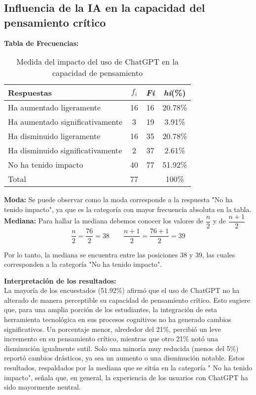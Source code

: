 \subsection{Influencia de la IA en la capacidad del pensamiento crítico}
\textbf{Tabla de Frecuencias:}
\begin{table}[H]
	\centering
	\renewcommand{\arraystretch}{1.2}
	\begin{tabular}{l c c c}
		\hline
		{Respuestas} & {\(f_i\)} & \textit{Fi} & \textit{hi}(\%)\\
		\hline
		Ha aumentado ligeramente       & 16 & 16 & 20.78\%\\
		Ha aumentado significativamente & 3  & 19 & 3.91\%\\
		Ha disminuido ligeramente       & 16 & 35 & 20.78\%\\
		Ha disminuido significativamente & 2  & 37 & 2.61\%\\
		No ha tenido impacto            & 40 & 77 & 51.92\%\\
		\hline
		Total                           & 77 &    & 100\%\\
		\hline
	\end{tabular}
	\caption{Medida del impacto del uso de ChatGPT en la capacidad de pensamiento }
	\label{tabla:pensamientoCritico}
\end{table}
\textbf{Moda:} Se puede observar como la moda corresponde a la respuesta "No ha tenido impacto", ya que es la categoría con mayor frecuencia absoluta en la tabla.\\

\textbf{Mediana:} Para hallar la mediana debemos conocer los valores de $\dfrac{n}{2}$ y de $\dfrac{n + 1}{2}$\\
\[
\dfrac{n}{2} = \dfrac{76}{2} = 38 \qquad \dfrac{n+1}{2} = \dfrac{76+1}{2} = 39
\]

Por lo tanto, la mediana se encuentra entre las posiciones 38 y 39, las cuales corresponden a la categoría "No ha tenido impacto".

\textbf{Interpretación de los resultados:}\\
La mayoría de los encuestados (51.92\%) afirmó que el uso de ChatGPT no ha alterado de manera perceptible su capacidad de pensamiento crítico. Esto sugiere que, para una amplia porción de los estudiantes, la integración de esta herramienta tecnológica en sus procesos cognitivos no ha generado cambios significativos. Un porcentaje menor, alrededor del 21\%, percibió un leve incremento en su pensamiento crítico, mientras que otro 21\% notó una disminución igualmente sutil. Solo una minoría muy reducida (menos del 5\%) reportó cambios drásticos, ya sea un aumento o una disminución notable. Estos resultados, respaldados por la mediana que se sitúa en la categoría " No ha tenido impacto", señala que, en general, la experiencia de los usuarios con ChatGPT ha sido mayormente neutral.
